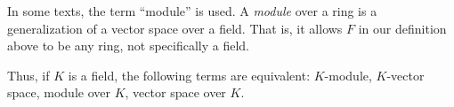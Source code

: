 \begin{note}
  In some texts, the term ``module'' is used. A \textit{module} over a ring is a
  generalization of a vector space over a field. That is, it allows $F$ in our
  definition above to be any ring, not specifically a field.

  Thus, if $K$ is a field, the following terms are equivalent: $K$-module,
  $K$-vector space, module over $K$, vector space over $K$.
\end{note}
